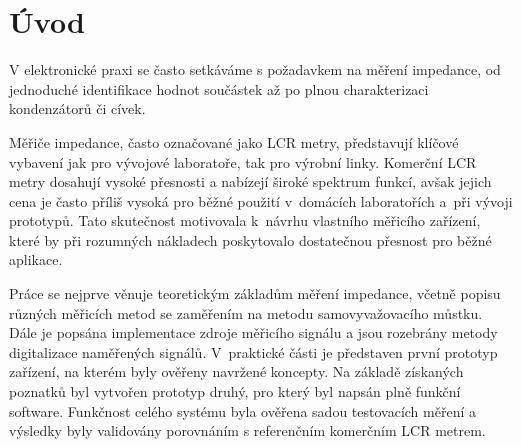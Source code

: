 \chapter*{Úvod}
{}

V elektronické praxi se často setkáváme s požadavkem na měření impedance, 
od jednoduché identifikace hodnot součástek až po plnou charakterizaci kondenzátorů či cívek.

Měřiče impedance, často označované jako \acs{LCR} metry, představují klíčové vybavení
jak pro vývojové laboratoře, tak pro výrobní linky.
Komerční \acs{LCR} metry dosahují vysoké přesnosti a nabízejí široké 
spektrum funkcí, avšak jejich cena je často příliš vysoká pro běžné 
použití v~domácích laboratořích a~při vývoji prototypů. Tato 
skutečnost motivovala k~návrhu vlastního měřicího zařízení, které by 
při rozumných nákladech poskytovalo dostatečnou přesnost pro běžné 
aplikace.

Práce se nejprve věnuje teoretickým základům měření impedance, 
včetně popisu různých měřicích metod se zaměřením na metodu 
samovyvažovacího můstku. Dále je popsána implementace zdroje 
měřicího signálu a jsou rozebrány 
metody digitalizace naměřených signálů. V~praktické části je 
představen první prototyp zařízení, na kterém byly ověřeny navržené 
koncepty. Na základě získaných poznatků byl vytvořen prototyp druhý, 
pro který byl napsán plně funkční software.
Funkčnost celého systému byla ověřena sadou testovacích měření a 
výsledky byly validovány porovnáním s referenčním komerčním LCR metrem.